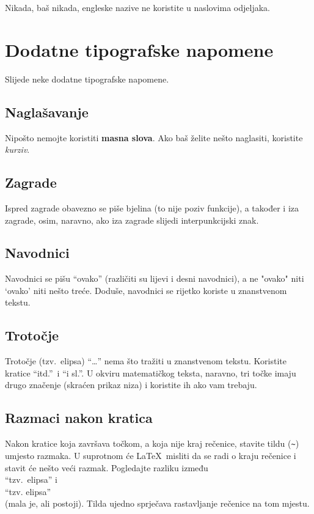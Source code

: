 \documentclass[10pt, a4paper]{article}
\begin{document}
Nikada, baš nikada, engleske nazive ne koristite u naslovima
odjeljaka.

\section{Dodatne tipografske napomene}

Slijede neke dodatne tipografske napomene.

\subsection{Naglašavanje}

Nipošto nemojte koristiti \textbf{masna slova}.  Ako baš želite nešto
naglasiti, koristite \emph{kurziv}.

\subsection{Zagrade}

Ispred zagrade obavezno se piše bjelina (to nije poziv funkcije), a
također i iza zagrade, osim, naravno, ako iza zagrade slijedi
interpunkcijski znak.

\subsection{Navodnici}

Navodnici se pišu ``ovako'' (različiti su lijevi i desni navodnici), a
ne "ovako" niti `ovako' niti nešto treće. Doduše, navodnici se rijetko
koriste u znanstvenom tekstu.

\subsection{Trotočje}

Trotočje (tzv.~elipsa) ``\dots'' nema što tražiti u znanstvenom
tekstu. Koristite kratice ``itd.''~i ``i sl.''. U okviru matematičkog
teksta, naravno, tri točke imaju drugo značenje (skraćen prikaz niza)
i koristite ih ako vam trebaju.

\subsection{Razmaci nakon kratica}

Nakon kratice koja završava točkom, a koja nije kraj rečenice, stavite
tildu (\verb.~.) umjesto razmaka. U suprotnom će \LaTeX\ misliti da se
radi o kraju rečenice i stavit će nešto veći razmak. Pogledajte
razliku između \\
\noindent ``tzv.~elipsa'' i \\
``tzv. elipsa''\\ 
\noindent (mala je, ali postoji). Tilda ujedno sprječava rastavljanje
rečenice na tom mjestu.
\end{document}
